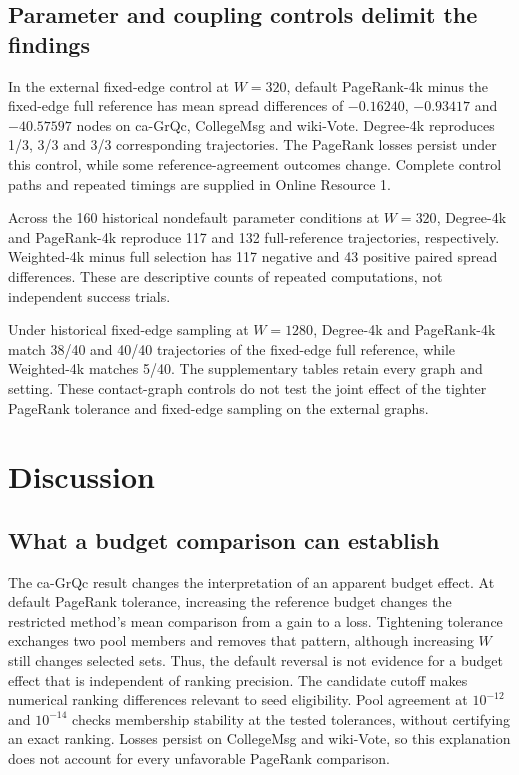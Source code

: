 \documentclass[smallextended]{svjour3}
\begin{document}
\subsection{Parameter and coupling controls delimit the findings}

In the external fixed-edge control at $W=320$, default PageRank-4k minus the fixed-edge full reference has mean spread differences of $-0.16240$, $-0.93417$ and $-40.57597$ nodes on ca-GrQc, CollegeMsg and wiki-Vote. Degree-4k reproduces 1/3, 3/3 and 3/3 corresponding trajectories. The PageRank losses persist under this control, while some reference-agreement outcomes change. Complete control paths and repeated timings are supplied in Online Resource 1.

Across the 160 historical nondefault parameter conditions at $W=320$, Degree-4k and PageRank-4k reproduce 117 and 132 full-reference trajectories, respectively. Weighted-4k minus full selection has 117 negative and 43 positive paired spread differences. These are descriptive counts of repeated computations, not independent success trials.

Under historical fixed-edge sampling at $W=1280$, Degree-4k and PageRank-4k match 38/40 and 40/40 trajectories of the fixed-edge full reference, while Weighted-4k matches 5/40. The supplementary tables retain every graph and setting. These contact-graph controls do not test the joint effect of the tighter PageRank tolerance and fixed-edge sampling on the external graphs.
\FloatBarrier

\section{Discussion}
\subsection{What a budget comparison can establish}
The ca-GrQc result changes the interpretation of an apparent budget effect. At default PageRank tolerance, increasing the reference budget changes the restricted method's mean comparison from a gain to a loss. Tightening tolerance exchanges two pool members and removes that pattern, although increasing $W$ still changes selected sets. Thus, the default reversal is not evidence for a budget effect that is independent of ranking precision. The candidate cutoff makes numerical ranking differences relevant to seed eligibility. Pool agreement at $10^{-12}$ and $10^{-14}$ checks membership stability at the tested tolerances, without certifying an exact ranking. Losses persist on CollegeMsg and wiki-Vote, so this explanation does not account for every unfavorable PageRank comparison.
\end{document}
